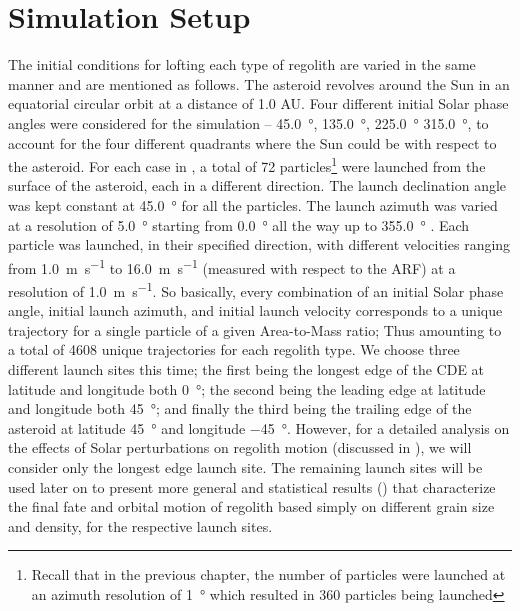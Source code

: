 \section{Simulation Setup}
\label{sec:simulation_setup}
The initial conditions for lofting each type of regolith are varied in the same manner and are mentioned as follows. The asteroid revolves around the Sun in an equatorial circular orbit at a distance of 1.0 \gls{AU}. Four different initial Solar phase angles were considered for the simulation – \SI{45.0}{\degree}, \SI{135.0}{\degree}, \SI{225.0}{\degree} \SI{315.0}{\degree}, to account for the four different quadrants where the Sun could be with respect to the asteroid.
%
\newline\newline
%
For each case in , a total of 72 particles\footnote{Recall that in the previous chapter, the number of particles were launched at an azimuth resolution of \SI{1}{\degree} which resulted in 360 particles being launched} were launched from the surface of the asteroid, each in a different direction. The launch declination angle was kept constant at \SI{45.0}{\degree}  for all the particles. The launch azimuth was varied at a resolution of \SI{5.0}{\degree}  starting from \SI{0.0}{\degree}  all the way up to \SI{355.0}{\degree} . Each particle was launched, in their specified direction, with different velocities ranging from \SI{1.0}{\metre\per\second} to \SI{16.0}{\metre\per\second} (measured with respect to the \gls{ARF}) at a resolution of \SI{1.0}{\metre\per\second}. So basically, every combination of an initial Solar phase angle, initial launch azimuth, and initial launch velocity corresponds to a unique trajectory for a single particle of a given Area-to-Mass ratio; Thus amounting to a total of 4608 unique trajectories for each regolith type.
%
\newline\newline
%
We choose three different launch sites this time; the first being the longest edge of the \gls{CDE} at latitude and longitude both \SI{0}{\degree}; the second being the leading edge at latitude and longitude both \SI{45}{\degree}; and finally the third being the trailing edge of the asteroid at latitude \SI{45}{\degree} and longitude \SI{-45}{\degree}. However, for a detailed analysis on the effects of Solar perturbations on regolith motion (discussed in ), we will consider only the longest edge launch site. The remaining launch sites will be used later on to present more general and statistical results () that characterize the final fate and orbital motion of regolith based simply on different grain size and density, for the respective launch sites.

